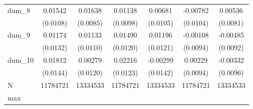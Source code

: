 {\begin{tabular}{l*{6}{c}}
dum\_8       &     0.01542         &     0.01638\sym{*}  &     0.01138         &     0.00681         &    -0.00782         &     0.00536         \\
            &    (0.0108)         &    (0.0085)         &    (0.0098)         &    (0.0105)         &    (0.0104)         &    (0.0081)         \\
dum\_9       &     0.01174         &     0.01133         &     0.01490         &     0.01196         &    -0.00108         &    -0.00485         \\
            &    (0.0132)         &    (0.0110)         &    (0.0120)         &    (0.0121)         &    (0.0094)         &    (0.0092)         \\
dum\_10      &     0.01812         &     0.00279         &     0.02216\sym{*}  &    -0.00299         &     0.00229         &    -0.00332         \\
            &    (0.0144)         &    (0.0120)         &    (0.0123)         &    (0.0142)         &    (0.0094)         &    (0.0096)         \\
\midrule
N           &    11784721         &    13334533         &    11784721         &    13334533         &    11784721         &    13334533         \\
max         &                     &                     &                     &                     &                     &                     \\
\bottomrule
\end{tabular}
}
